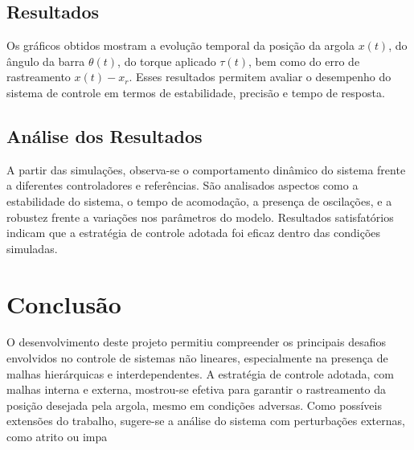 \documentclass[a4paper, 12pt]{article}
\begin{document}
\subsection{Resultados}
Os gráficos obtidos mostram a evolução temporal da posição da argola \( x(t) \), do ângulo da barra \( \theta(t) \), do torque aplicado \( \tau(t) \), bem como do erro de rastreamento \( x(t) - x_r \). Esses resultados permitem avaliar o desempenho do sistema de controle em termos de estabilidade, precisão e tempo de resposta.

\subsection{Análise dos Resultados}
A partir das simulações, observa-se o comportamento dinâmico do sistema frente a diferentes controladores e referências. São analisados aspectos como a estabilidade do sistema, o tempo de acomodação, a presença de oscilações, e a robustez frente a variações nos parâmetros do modelo. Resultados satisfatórios indicam que a estratégia de controle adotada foi eficaz dentro das condições simuladas.

\section{Conclusão}
O desenvolvimento deste projeto permitiu compreender os principais desafios envolvidos no controle de sistemas não lineares, especialmente na presença de malhas hierárquicas e interdependentes. A estratégia de controle adotada, com malhas interna e externa, mostrou-se efetiva para garantir o rastreamento da posição desejada pela argola, mesmo em condições adversas. Como possíveis extensões do trabalho, sugere-se a análise do sistema com perturbações externas, como atrito ou impa
\end{document}

